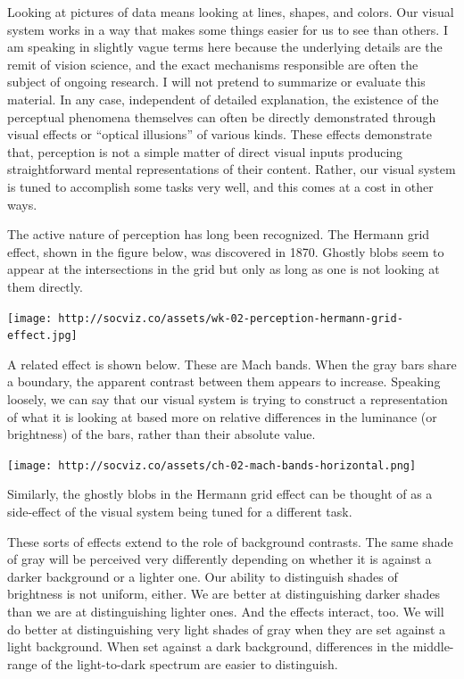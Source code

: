 \documentclass[
]{book}
\begin{document}
Looking at pictures of data means looking at lines, shapes, and colors. Our visual system works in a way that makes some things easier for us to see than others. I am speaking in slightly vague terms here because the underlying details are the remit of vision science, and the exact mechanisms responsible are often the subject of ongoing research. I will not pretend to summarize or evaluate this material. In any case, independent of detailed explanation, the existence of the perceptual phenomena themselves can often be directly demonstrated through visual effects or ``optical illusions'' of various kinds. These effects demonstrate that, perception is not a simple matter of direct visual inputs producing straightforward mental representations of their content. Rather, our visual system is tuned to accomplish some tasks very well, and this comes at a cost in other ways.

The active nature of perception has long been recognized. The Hermann grid effect, shown in the figure below, was discovered in 1870. Ghostly blobs seem to appear at the intersections in the grid but only as long as one is not looking at them directly.

\texttt{[image: http://socviz.co/assets/wk-02-perception-hermann-grid-effect.jpg]}

A related effect is shown below. These are Mach bands. When the gray bars share a boundary, the apparent contrast between them appears to increase. Speaking loosely, we can say that our visual system is trying to construct a representation of what it is looking at based more on relative differences in the luminance (or brightness) of the bars, rather than their absolute value.

\texttt{[image: http://socviz.co/assets/ch-02-mach-bands-horizontal.png]}

Similarly, the ghostly blobs in the Hermann grid effect can be thought of as a side-effect of the visual system being tuned for a different task.

These sorts of effects extend to the role of background contrasts. The same shade of gray will be perceived very differently depending on whether it is against a darker background or a lighter one. Our ability to distinguish shades of brightness is not uniform, either. We are better at distinguishing darker shades than we are at distinguishing lighter ones. And the effects interact, too. We will do better at distinguishing very light shades of gray when they are set against a light background. When set against a dark background, differences in the middle-range of the light-to-dark spectrum are easier to distinguish.
\end{document}
